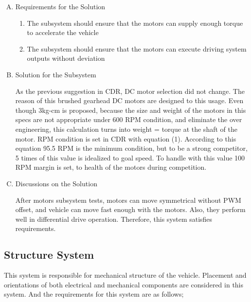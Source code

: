 \documentclass[a4paper,12pt]{article}
\begin{document}
\begin{enumerate}[A.]

\item {Requirements for the Solution}


\begin{enumerate}[1)]

\item The subsystem should ensure that the motors can supply enough torque to accelerate the vehicle 

\item The subsystem should ensure that the motors can execute driving system outputs without deviation

\end{enumerate} 


\item {Solution for the Subsystem}


As the previous suggestion in CDR, DC motor selection did not change. The reason of this brushed gearhead DC motors are designed to this usage. Even though 3kg-cm is proposed, because the size and weight of the motors in this specs are not appropriate under 600 RPM condition, and eliminate the over engineering, this calculation turns into weight = torque at the shaft of the motor. RPM condition is set in CDR with equation (1). According to this equation 95.5 RPM is the minimum condition, but to be a strong competitor, 5 times of this value is idealized to goal speed. To handle with this value 100 RPM margin is set, to health of the motors during competition.   




\item {Discussions on the Solution}


After motors subsystem tests, motors can move symmetrical without PWM offset, and vehicle can move fast enough with the motors. Also, they perform well in differential drive operation. Therefore, this system satisfies requirements. 


\end{enumerate}	





\subsection{Structure System}


This system is responsible for mechanical structure of the vehicle. Placement and orientations of both electrical and mechanical components are considered in this system. And the requirements for this system are as follows;
\end{document}
